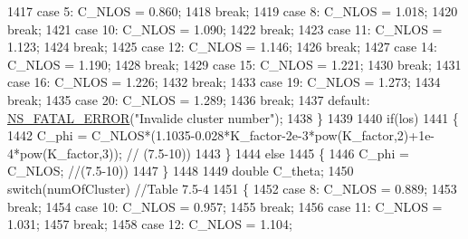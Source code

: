 \begin{DoxyCode}
1417                 \textcolor{keywordflow}{case} 5: C\_NLOS = 0.860;
1418                                 \textcolor{keywordflow}{break};
1419                 \textcolor{keywordflow}{case} 8: C\_NLOS = 1.018;
1420                                 \textcolor{keywordflow}{break};
1421                 \textcolor{keywordflow}{case} 10: C\_NLOS = 1.090;
1422                                  \textcolor{keywordflow}{break};
1423                 \textcolor{keywordflow}{case} 11: C\_NLOS = 1.123;
1424                                  \textcolor{keywordflow}{break};
1425                 \textcolor{keywordflow}{case} 12: C\_NLOS = 1.146;
1426                                  \textcolor{keywordflow}{break};
1427                 \textcolor{keywordflow}{case} 14: C\_NLOS = 1.190;
1428                                  \textcolor{keywordflow}{break};
1429                 \textcolor{keywordflow}{case} 15: C\_NLOS = 1.221;
1430                                  \textcolor{keywordflow}{break};
1431                 \textcolor{keywordflow}{case} 16: C\_NLOS = 1.226;
1432                                  \textcolor{keywordflow}{break};
1433                 \textcolor{keywordflow}{case} 19: C\_NLOS = 1.273;
1434                                  \textcolor{keywordflow}{break};
1435                 \textcolor{keywordflow}{case} 20: C\_NLOS = 1.289;
1436                                  \textcolor{keywordflow}{break};
1437                 \textcolor{keywordflow}{default}: \hyperlink{group__fatal_ga5131d5e3f75d7d4cbfd706ac456fdc85}{NS\_FATAL\_ERROR}(\textcolor{stringliteral}{"Invalide cluster number"});
1438         \}
1439 
1440         \textcolor{keywordflow}{if}(los)
1441         \{
1442                 C\_phi = C\_NLOS*(1.1035-0.028*K\_factor-2e-3*pow(K\_factor,2)+1e-4*pow(K\_factor,3)); \textcolor{comment}{//
      (7.5-10))}
1443         \}
1444         \textcolor{keywordflow}{else}
1445         \{
1446                 C\_phi = C\_NLOS; \textcolor{comment}{//(7.5-10))}
1447         \}
1448 
1449         \textcolor{keywordtype}{double} C\_theta;
1450         \textcolor{keywordflow}{switch}(numOfCluster) \textcolor{comment}{//Table 7.5-4}
1451         \{
1452                 \textcolor{keywordflow}{case} 8: C\_NLOS = 0.889;
1453                                 \textcolor{keywordflow}{break};
1454                 \textcolor{keywordflow}{case} 10: C\_NLOS = 0.957;
1455                                 \textcolor{keywordflow}{break};
1456                 \textcolor{keywordflow}{case} 11: C\_NLOS = 1.031;
1457                                 \textcolor{keywordflow}{break};
1458                 \textcolor{keywordflow}{case} 12: C\_NLOS = 1.104;

\end{DoxyCode}
